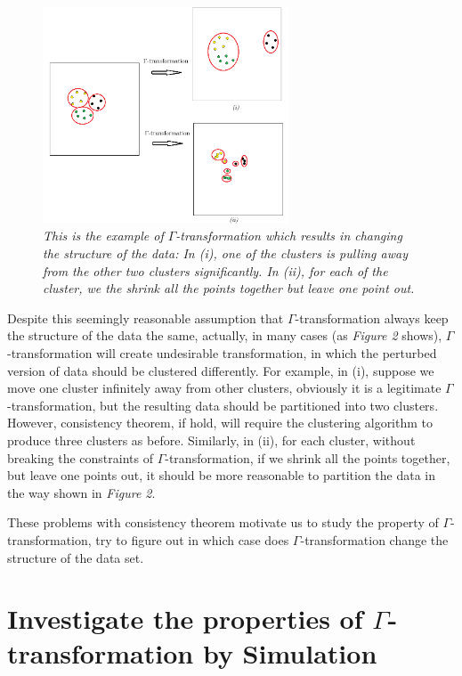 \documentclass{uonmathreport}
\begin{document}
\begin{figure}[H]
 \begin{center}
   \includegraphics[width=0.65\textwidth]{Paper_figure_2.png}
 \end{center}
 \caption{\textit{This is the example of $\Gamma$-transformation which results in changing the structure of the data: In (i), one of the clusters is pulling away from the other two clusters significantly. In (ii), for each of the cluster, we the shrink all the points together but leave one point out.}}
 \label{fig:bsd}
\end{figure}

Despite this seemingly reasonable assumption that $\Gamma$-transformation always keep the structure of the data the same, actually, in many cases (as \textit{Figure 2} shows), $\Gamma$-transformation will create undesirable transformation, in which the perturbed version of data should be clustered differently. For example, in (i), suppose we move one cluster infinitely away from other clusters, obviously it is a legitimate $\Gamma$-transformation, but the resulting data should be partitioned into  two clusters. However, consistency theorem, if hold, will require the clustering algorithm to produce three clusters as before. Similarly, in (ii), for each cluster, without breaking the constraints of $\Gamma$-transformation, if we shrink all the points together, but leave one points out, it should be more reasonable to partition the data in the way shown in \textit{Figure 2}.

These problems with consistency theorem motivate us to study the property of $\Gamma$-transformation, try to figure out in which case does $\Gamma$-transformation change the structure of the data set.
\section{Investigate the properties of $\Gamma$-transformation by Simulation} \label{sec:framework}
\end{document}
